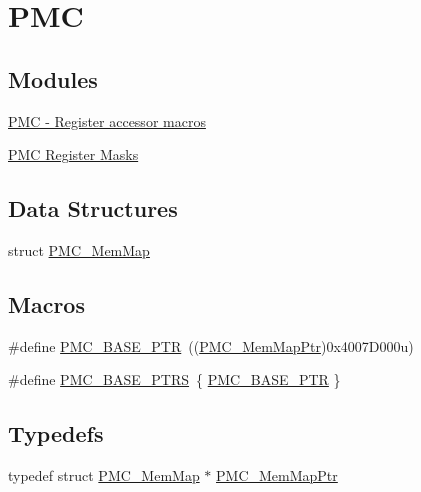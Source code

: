 \hypertarget{group___p_m_c___peripheral}{}\section{P\+MC}
\label{group___p_m_c___peripheral}
\subsection*{Modules}
\begin{DoxyCompactItemize}
\item 
\hyperlink{group___p_m_c___register___accessor___macros}{P\+M\+C -\/ Register accessor macros}
\item 
\hyperlink{group___p_m_c___register___masks}{P\+M\+C Register Masks}
\end{DoxyCompactItemize}
\subsection*{Data Structures}
\begin{DoxyCompactItemize}
\item 
struct \hyperlink{struct_p_m_c___mem_map}{P\+M\+C\+\_\+\+Mem\+Map}
\end{DoxyCompactItemize}
\subsection*{Macros}
\begin{DoxyCompactItemize}
\item 
\#define \hyperlink{group___p_m_c___peripheral_gaf32df9f1096263f10a5e8978a338b2ac}{P\+M\+C\+\_\+\+B\+A\+S\+E\+\_\+\+P\+TR}~((\hyperlink{group___p_m_c___peripheral_ga0e73f22a2fa26cbb012851719e34812e}{P\+M\+C\+\_\+\+Mem\+Map\+Ptr})0x4007\+D000u)
\item 
\#define \hyperlink{group___p_m_c___peripheral_ga4bcd62643d597f7230f9c1e3d03caaa7}{P\+M\+C\+\_\+\+B\+A\+S\+E\+\_\+\+P\+T\+RS}~\{ \hyperlink{group___p_m_c___peripheral_gaf32df9f1096263f10a5e8978a338b2ac}{P\+M\+C\+\_\+\+B\+A\+S\+E\+\_\+\+P\+TR} \}
\end{DoxyCompactItemize}
\subsection*{Typedefs}
\begin{DoxyCompactItemize}
\item 
typedef struct \hyperlink{struct_p_m_c___mem_map}{P\+M\+C\+\_\+\+Mem\+Map} $\ast$ \hyperlink{group___p_m_c___peripheral_ga0e73f22a2fa26cbb012851719e34812e}{P\+M\+C\+\_\+\+Mem\+Map\+Ptr}
\end{DoxyCompactItemize}


